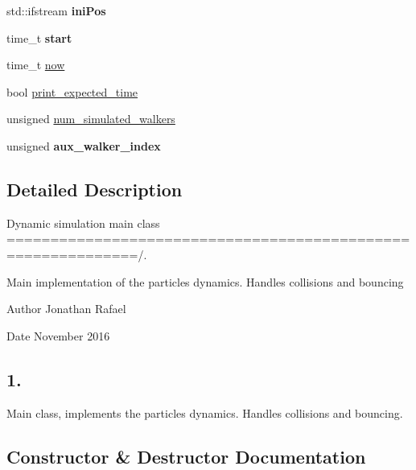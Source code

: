 \begin{DoxyCompactItemize}
std\+::ifstream {\bfseries ini\+Pos}
\item 
\mbox{\label{class_dynamics_simulation_a6fc87bbfea509599236624fda517c901}} 
time\+\_\+t {\bfseries start}
\item 
time\+\_\+t \hyperlink{class_dynamics_simulation_a4e14e7f5efc039772219b00b02381db1}{now}
\item 
bool \hyperlink{class_dynamics_simulation_a8742da6be78261e71b9b8cd4de0df488}{print\+\_\+expected\+\_\+time}
\item 
unsigned \hyperlink{class_dynamics_simulation_a8772d8683d6089eef368212ee99d12d5}{num\+\_\+simulated\+\_\+walkers}
\item 
\mbox{\label{class_dynamics_simulation_a09d2b3a3b998c85d98a5b87509a1e13a}} 
unsigned {\bfseries aux\+\_\+walker\+\_\+index}
\end{DoxyCompactItemize}


\subsection{Detailed Description}
Dynamic simulation main class =============================================================/. 

Main implementation of the particles dynamics. Handles collisions and bouncing \begin{DoxyAuthor}{Author}
Jonathan Rafael 
\end{DoxyAuthor}
\begin{DoxyDate}{Date}
November 2016 \subsection*{1. }
\end{DoxyDate}


Main class, implements the particles dynamics. Handles collisions and bouncing. 

\subsection{Constructor \& Destructor Documentation}
\mbox{\label{class_dynamics_simulation_ad9a3e1f235466c3827cb49c67d3a6147}} 
